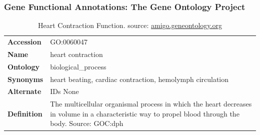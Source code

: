 \documentclass[aspectratio=169, 10pt]{beamer}\usepackage[]{graphicx}\usepackage[]{color}
\begin{document}
\begin{frame}
\frametitle{Gene Functional Annotations: The Gene Ontology Project}

\begin{table}
\footnotesize
\begin{tabular}{lm{.6\linewidth}}
\toprule
\textbf{Accession} & GO:0060047 \\
\textbf{Name} & heart contraction \\
\textbf{Ontology} & biological\_process \\
\textbf{Synonyms} & heart beating, cardiac contraction, hemolymph circulation \\
\textbf{Alternate} & IDs None \\
\textbf{Definition} & The multicellular organismal process in which the heart decreases in volume in a 
characteristic way to propel blood through the body. Source: GOC:dph \\
\bottomrule
\end{tabular}
\caption{Heart Contraction Function. source: \href{http://amigo.geneontology.org/amigo/term/GO:0060047}{amigo.geneontology.org}}
\end{table}


\end{frame}
\end{document}
